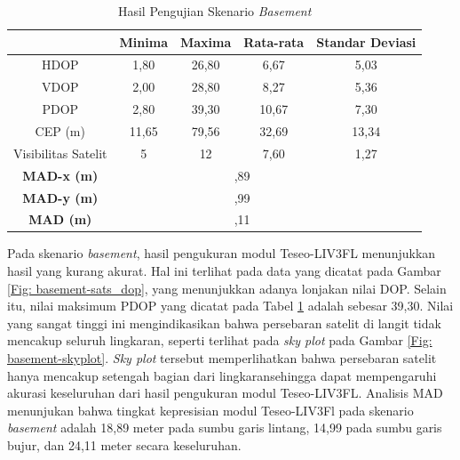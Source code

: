 \begin{table}[H]
	\caption{Hasil Pengujian Skenario \textit{Basement}}
	\vspace{0.5em}
	\centering
	\begin{tabular}{ccccc}
		\hline
		& \textbf{Minima} & \textbf{Maxima} & \textbf{Rata-rata} & \textbf{Standar Deviasi}\\
		\hline 
		HDOP & 1,80 & 26,80 & 6,67 & 5,03\\
		VDOP & 2,00 & 28,80 & 8,27 & 5,36\\
		PDOP & 2,80 & 39,30 & 10,67 & 7,30\\
		CEP (m) & 11,65 & 79,56 & 32,69 & 13,34\\
		Visibilitas Satelit & 5 & 12 & 7,60 & 1,27\\
		\hline
		\textbf{MAD-x (m)} & & \multicolumn{2}{c}{\centering 18,89} & \\
		\hline
		\textbf{MAD-y (m)} & & \multicolumn{2}{c}{\centering 14,99} & \\
		\hline
		\textbf{MAD (m)} & & \multicolumn{2}{c}{\centering 24,11} & \\
		\hline
	\end{tabular}
	\label{Tab: basement-table}
\end{table}

Pada skenario \textit{basement}, hasil pengukuran modul Teseo-LIV3FL menunjukkan hasil yang kurang akurat. Hal ini terlihat pada data yang dicatat pada Gambar \ref{Fig: basement-sats_dop}, yang menunjukkan adanya lonjakan nilai DOP. Selain itu, nilai maksimum PDOP yang dicatat pada Tabel \ref{Tab: basement-table} adalah sebesar 39,30. Nilai yang sangat tinggi ini mengindikasikan bahwa persebaran satelit di langit tidak mencakup seluruh lingkaran, seperti terlihat pada \textit{sky plot} pada Gambar \ref{Fig: basement-skyplot}. \textit{Sky plot} tersebut memperlihatkan bahwa persebaran satelit hanya mencakup setengah bagian dari lingkaransehingga dapat mempengaruhi akurasi keseluruhan dari hasil pengukuran modul Teseo-LIV3FL. Analisis MAD menunjukan bahwa tingkat kepresisian modul Teseo-LIV3Fl pada skenario \textit{basement} adalah 18,89 meter pada sumbu garis lintang, 14,99 pada sumbu garis bujur, dan 24,11 meter secara keseluruhan.

